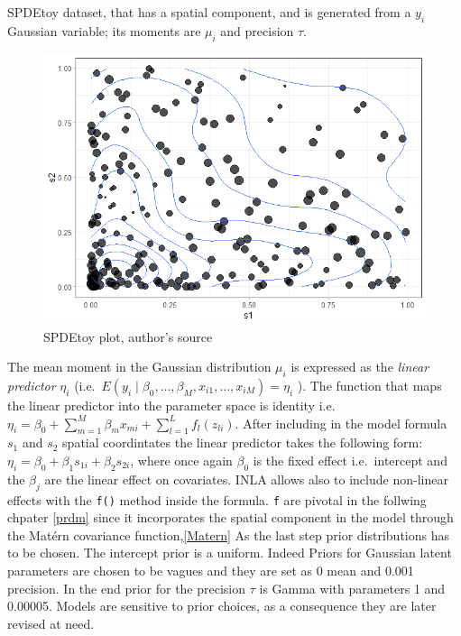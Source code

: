 \documentclass[
  12pt,
  a4paper,
  oneside]{book}
\newcommand{\passthrough}[1]{#1}
\theoremstyle{definition}
\theoremstyle{definition}
\theoremstyle{definition}
\theoremstyle{remark}
\begin{document}
SPDEtoy dataset, that has a spatial component, and is generated from a \(y_{i}\) Gaussian variable; its moments are \(\mu_{i}\) and precision \(\tau\).

\begin{figure}
\centering
\includegraphics{images/cotour_toy.png}
\caption{\label{fig:SPDEplot}SPDEtoy plot, author's source}
\end{figure}

The mean moment in the Gaussian distribution \(\mu_{i}\) is expressed as the \emph{linear predictor} \(\eta_{i}\) (i.e.~\(E\left(y_{i} \mid \beta_{0}, \ldots, \beta_{M}, x_{i 1}, \ldots, x_{i M}\right) = \eta_{i}\) ). The function that maps the linear predictor into the parameter space is identity i.e.~\(\eta_{i}=\beta_{0}+\sum_{m=1}^{M} \beta_{m} x_{m i}+\sum_{l=1}^{L} f_{l}\left(z_{l i}\right)\).
After including in the model formula \(s_{1}\) and \(s_{2}\) spatial coordintates the linear predictor takes the following form: \(\eta_{i}=\beta_{0}+\beta_{1} s_{1 i}+\beta_{2} s_{2 i}\), where once again \(\beta_{0}\) is the fixed effect i.e.~intercept and the \(\beta_{j}\) are the linear effect on covariates. INLA allows also to include non-linear effects with the \passthrough{\lstinline!f()!} method inside the formula. \passthrough{\lstinline!f!} are pivotal in the follwing chpater \ref{prdm} since it incorporates the spatial component in the model through the Matérn covariance function,\ref{Matern}
As the last step prior distributions has to be chosen. The intercept prior is a uniform. Indeed Priors for Gaussian latent parameters are chosen to be vagues and they are set as 0 mean and 0.001 precision. In the end prior for the precision \(\tau\) is Gamma with parameters 1 and 0.00005. Models are sensitive to prior choices, as a consequence they are later revised at need.
\end{document}
